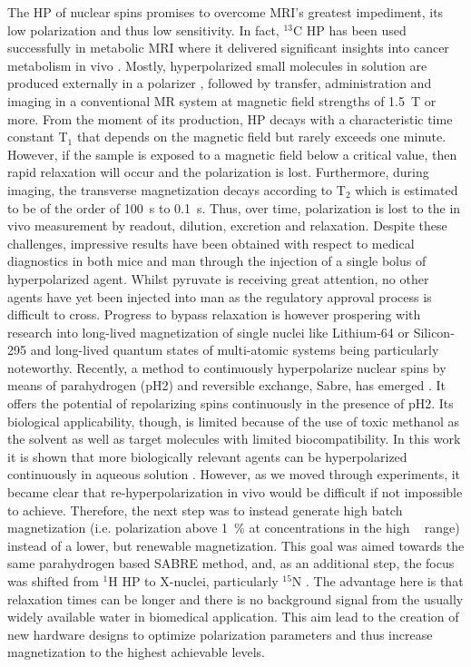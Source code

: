     The HP of nuclear spins promises to overcome MRI's greatest impediment, its low polarization and thus low sensitivity. In fact, $^{13}$C HP has been used successfully in metabolic MRI where it delivered significant insights into cancer metabolism in vivo \cite{golman_cardiac_2008}. Mostly, hyperpolarized small molecules in solution are produced externally in a polarizer \cite{ardenkjaer-larsen_present_2016}, followed by transfer, administration and imaging in a conventional MR system at magnetic field strengths of \SI{1.5}{\tesla} or more. From the moment of its production, HP decays with a characteristic time constant T$_1$ that depends on the magnetic field but rarely exceeds one minute. However, if the sample is exposed to a magnetic field below a critical value, then rapid relaxation will occur and the polarization is lost. Furthermore, during imaging, the transverse magnetization decays according to T$_2$ which is estimated to be of the order of \SI{100}{\second} to  \SI{0.1}{\second}. Thus, over time, polarization is lost to the in vivo measurement by readout, dilution, excretion and relaxation. Despite these challenges, impressive results have been obtained with respect to medical diagnostics in both mice and man through the injection of a single bolus of hyperpolarized agent. Whilst pyruvate is receiving great attention, no other agents have yet been injected into man as the regulatory approval process is difficult to cross. Progress to bypass relaxation is however prospering with research into long-lived magnetization of single nuclei like Lithium-64 \cite{van_heeswijk_hyperpolarized_2009} or Silicon-295 \cite{kwiatkowski_nanometer_2017} and long-lived quantum states of multi-atomic systems \cite{pileio_storage_2010, noauthor_y._nodate} being particularly noteworthy. Recently, a method to continuously hyperpolarize  nuclear spins by means of parahydrogen (pH2) and reversible exchange, Sabre, has emerged \cite{adams_reversible_2009-2, hovener_continuous_2014-1}. It offers the potential of repolarizing spins continuously in the presence of pH2. Its biological applicability, though, is limited because of the use of toxic methanol as the solvent as well as target molecules with limited biocompatibility. In this work it is shown that more biologically relevant agents can be hyperpolarized continuously in aqueous solution \cite{truong_irreversible_2014-1}. However, as we moved through experiments, it became clear that re-hyperpolarization in vivo would be difficult if not impossible to achieve. Therefore, the next step was to instead generate high batch magnetization (i.e. polarization above \SI{1}{\percent} at concentrations in the high \si{\milli\molar} range) instead of a lower, but renewable magnetization. This goal was aimed towards the same parahydrogen based SABRE method, and, as an additional step, the focus was shifted from $^1$H HP to X-nuclei, particularly $^{15}$N \cite{truong_15n_2015-1}. The advantage here is that relaxation times can be longer and there is no background signal from the usually widely available water in biomedical application. This aim lead to the creation of new hardware designs to optimize polarization parameters and thus increase magnetization to the highest achievable levels.

